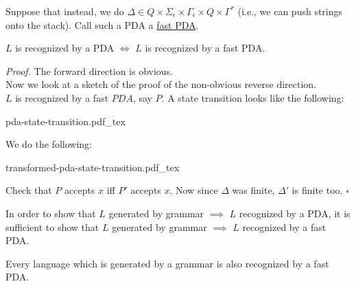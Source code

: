 \documentclass[a4paper]{article}
\newenvironment{proof}{\begin{breakbox}\textit{Proof.}}{\hfill$\square$\end{breakbox}}
\newcommand{\nl}{\vspace{0.2cm}\\}
\newcommand{\incfig}[1]{%
    \def\svgwidth{\columnwidth}
    {#1.pdf_tex}
}
\begin{document}
Suppose that instead, we do $\Delta \in Q \times \Sigma_\epsilon \times \Gamma_\epsilon \times Q \times \Gamma^*$ (i.e., we can push strings onto the stack). Call such a PDA a \underline{fast
PDA}.

\begin{theorem}
    $L$ is recognized by a PDA $\iff$ $L$ is recognized by a fast PDA.
\end{theorem}

\begin{proof}
    The forward direction is obvious.\nl
    Now we look at a sketch of the proof of the non-obvious reverse direction.\nl
    $L$ is recognized by a fast $PDA$, say $P$. A state transition looks like the following:
    \begin{center}
        
    \incfig{pda-state-transition}
    \end{center}
    We do the following:
    \begin{center}
    \incfig{transformed-pda-state-transition}
    \end{center}
    Check that $P$ accepts $x$ iff $P'$ accepts $x$. Now since $\Delta$ was finite, $\Delta'$ is finite too.
\end{proof}

\begin{cor}
    In order to show that $L$ generated by grammar $\implies$ $L$ recognized by a PDA, it is sufficient to show that $L$ generated by grammar $\implies$ $L$ recognized by a fast PDA.
\end{cor}

\begin{theorem}
    Every language which is generated by a grammar is also recognized by a fast PDA.
\end{theorem}
\end{document}
